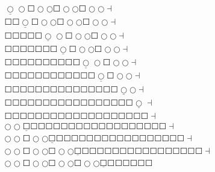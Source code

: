 \begin{eqnarray*}
& & \underline{\Circle} \Circle \Square \Circle \Circle \Square \Circle \Circle
\Square \Circle \Circle \dashv\\
& & \Square \Square \underline{\Circle} \Square \Circle \Circle \Square \Circle
\Circle \Square \Circle \Circle \dashv\\
& & \Square \Square \Square \Square \Square \underline{\Circle} \Circle \Square
\Circle \Circle \Square \Circle \Circle \dashv\\
& & \Square \Square \Square \Square \Square \Square \Square \underline{\Circle}
\Square \Circle \Circle \Square \Circle \Circle \dashv\\
& & \Square \Square \Square \Square \Square \Square \Square \Square \Square \Square
\underline{\Circle} \Circle \Square \Circle \Circle \dashv\\
& & \Square \Square \Square \Square \Square \Square \Square \Square \Square \Square
\Square \Square \underline{\Circle} \Square \Circle \Circle \dashv\\
& & \Square \Square \Square \Square \Square \Square \Square \Square \Square \Square
\Square \Square \Square \Square \Square \underline{\Circle} \Circle \dashv\\
& & \Square \Square \Square \Square \Square \Square \Square \Square \Square \Square
\Square \Square \Square \Square \Square \Square \Square \underline{\Circle} \dashv\\
& & \Square \Square \Square \Square \Square \Square \Square \Square \Square \Square
\Square \Square \Square \Square \Square \Square \Square \Square \Square \dashv\\
& & \Circle \Circle \underline{\Square} \Square \Square \Square \Square \Square \Square \Square \Square \Square
\Square \Square \Square \Square \Square \Square \Square \Square \Square \dashv\\
& & \Circle \Circle \Square \Circle \Circle \underline{\Square} \Square \Square \Square \Square \Square \Square \Square \Square
\Square \Square \Square \Square \Square \Square \Square \Square \Square \dashv\\
& & \Circle \Circle \Square \Circle \Circle \Square \Circle \Circle \underline{\Square} \Square \Square \Square \Square \Square \Square \Square
\Square \Square \Square \Square \Square \Square \Square \Square \Square \dashv\\
& & \Circle \Circle \Square \Circle \Circle \Square \Circle \Circle \Square \Circle \Circle \underline{\Square} \Square \Square \Square \Square \Square \Square

\end{eqnarray*}
